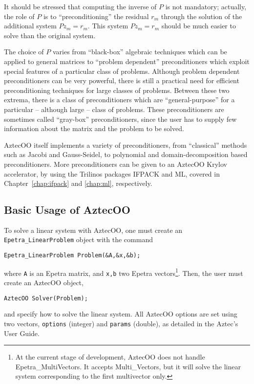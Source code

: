 It should be stressed that computing the inverse of $P$ is not
mandatory; actually, the role of $P$ is to ``preconditioning'' the
residual $r_m$ through the solution of the additional system $P
z_m = r_m$. This system $P z_m = {r}_m$ should be much
easier to solve than the original system. 

\smallskip

The choice of $P$ varies from ``black-box'' algebraic techniques which
can be applied to general matrices to ``problem dependent''
preconditioners which exploit special features of a particular class
of problems. Although problem dependent preconditioners can be very
powerful, there is still a practical need for efficient
preconditioning techniques for large classes of problems. Between
these two extrema, there is a class of preconditioners which are
``general-purpose'' for a particular -- although large -- class of
problems.  These preconditioners are sometimes called ``gray-box''
preconditioners, since the user has to supply few information about
the matrix and the problem to be solved.

AztecOO itself implements a variety of preconditioners, from
``classical'' methods such as Jacobi and Gauss-Seidel, to polynomial and
domain-decomposition based preconditioners. More preconditioners can be
given to an AztecOO Krylov accelerator, by using the Trilinos packages
IFPACK and ML, covered in Chapter~\ref{chap:ifpack} and \ref{chap:ml},
respectively.


\subsection{Basic Usage of AztecOO}
\label{sec:basic_aztecoo}

To solve a linear system with AztecOO, one must create an
\verb!Epetra_LinearProblem!  object with the command
\begin{verbatim}
Epetra_LinearProblem Problem(&A,&x,&b);
\end{verbatim}
where \verb!A! is an Epetra matrix, and \verb!x,b! two Epetra
vectors\footnote{At the current stage of development, AztecOO does not
  handle Epetra\_MultiVectors. It accepts Multi\_Vectors, but it will
  solve the linear system corresponding to the first multivector only.}.
Then, the user must create an AztecOO object,
\begin{verbatim}
AztecOO Solver(Problem);
\end{verbatim}
and specify how to solve the linear system. All AztecOO options are set
using two vectors, \verb!options! (integer) and \verb!params! (double),
as detailed in the Aztec's User Guide.

